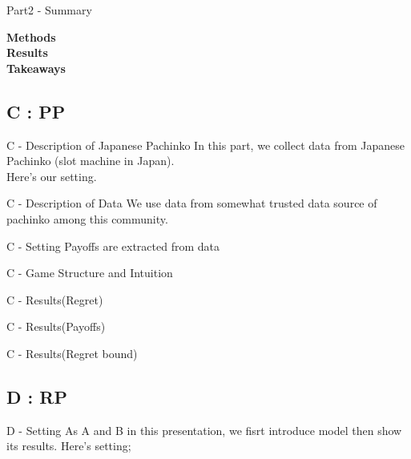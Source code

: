 \documentclass{beamer}
\begin{document}
\begin{frame}{Part2 - Summary}

\textbf{Methods}\\

\textbf{Results}\\

\textbf{Takeaways}\\

\end{frame}

\subsection{C : PP}

\begin{frame}{C - Description of Japanese Pachinko}
In this part, we collect data from Japanese Pachinko (slot machine in Japan).\\
Here's our setting. 

\end{frame}

\begin{frame}{C - Description of Data}
We use data from somewhat trusted data source of pachinko among this community.

\end{frame}

\begin{frame}{C - Setting}
Payoffs are extracted from data

\end{frame}

\begin{frame}{C - Game Structure and Intuition}

\end{frame}

\begin{frame}{C - Results(Regret)}

    
\end{frame}


\begin{frame}{C - Results(Payoffs)}

    
\end{frame}

\begin{frame}{C - Results(Regret bound)}

    
\end{frame}



\subsection{D : RP}
\begin{frame}{D - Setting}
As A and B in this presentation, we fisrt introduce model then show its results.
Here's setting; 

    
\end{frame}
\end{document}
